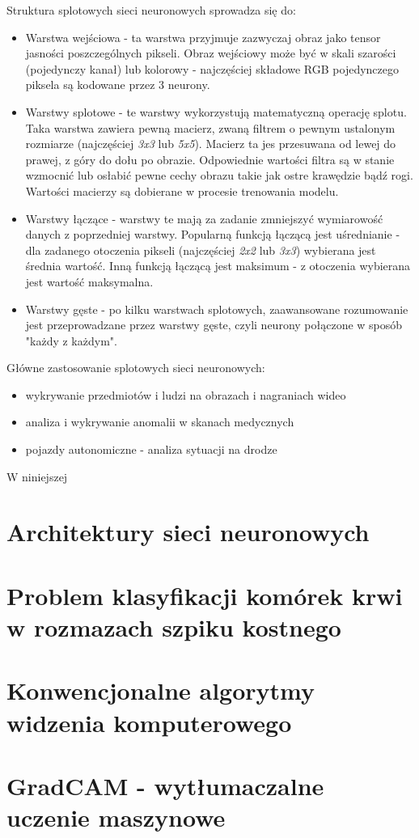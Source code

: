 Struktura splotowych sieci neuronowych sprowadza się do:
\begin{itemize}
    \item Warstwa wejściowa - ta warstwa przyjmuje zazwyczaj obraz jako tensor jasności poszczególnych pikseli.
    Obraz wejściowy może być w skali szarości (pojedynczy kanał) lub kolorowy - najczęściej składowe RGB pojedynczego piksela są kodowane przez 3 neurony.
    \item Warstwy splotowe - te warstwy wykorzystują matematyczną operację splotu.
    Taka warstwa zawiera pewną macierz, zwaną filtrem o pewnym ustalonym rozmiarze (najczęściej \textit{3x3} lub \textit{5x5}).
    Macierz ta jes przesuwana od lewej do prawej, z góry do dołu po obrazie.
    Odpowiednie wartości filtra są w stanie wzmocnić lub osłabić pewne cechy obrazu takie jak ostre krawędzie bądź rogi.
    Wartości macierzy są dobierane w procesie trenowania modelu.
    \item Warstwy łączące - warstwy te mają za zadanie zmniejszyć wymiarowość danych z poprzedniej warstwy.
    Popularną funkcją łączącą jest uśrednianie - dla zadanego otoczenia pikseli (najczęściej \textit{2x2} lub \textit{3x3}) wybierana jest średnia wartość.
    Inną funkcją łączącą jest maksimum - z otoczenia wybierana jest wartość maksymalna.
    \item Warstwy gęste - po kilku warstwach splotowych, zaawansowane rozumowanie jest przeprowadzane przez warstwy gęste, czyli neurony połączone w sposób "każdy z każdym".
\end{itemize}

Główne zastosowanie splotowych sieci neuronowych:
\begin{itemize}
    \item wykrywanie przedmiotów i ludzi na obrazach i nagraniach wideo
    \item analiza i wykrywanie anomalii w skanach medycznych
    \item pojazdy autonomiczne - analiza sytuacji na drodze
\end{itemize}

W niniejszej


\section{Architektury sieci neuronowych}



\section{Problem klasyfikacji komórek krwi w rozmazach szpiku kostnego}


\section{Konwencjonalne algorytmy widzenia komputerowego}


\section{GradCAM - wytłumaczalne uczenie maszynowe}